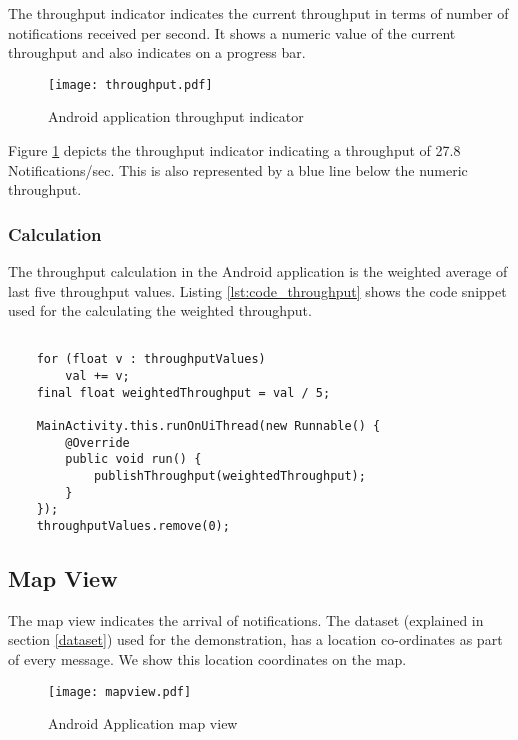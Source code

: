 The throughput indicator indicates the current throughput in terms of number of notifications received per second. It shows a numeric value of the current throughput and also indicates on a progress bar.

\begin{figure}[h!]
\centering
\texttt{[image: throughput.pdf]}
\caption{Android application throughput indicator}\label{figures:android_throughput}
\end{figure}

Figure {\ref{figures:android_throughput}} depicts the throughput indicator indicating a throughput of 27.8 Notifications/sec. This is also represented by a blue line below the numeric throughput.

\subsubsection{Calculation}

The throughput calculation in the Android application is the weighted average of last five throughput values.
Listing \ref{lst:code_throughput} shows the code snippet used for the calculating the weighted throughput.

\bigskip
\begin{lstlisting}[style=JavaInputStyle,caption=Throughput calculation code snippet, label={lst:code_throughput}]

    for (float v : throughputValues)
        val += v;
    final float weightedThroughput = val / 5;

    MainActivity.this.runOnUiThread(new Runnable() {
        @Override
        public void run() {
            publishThroughput(weightedThroughput);
        }
    });
    throughputValues.remove(0);

\end{lstlisting}

\subsection{Map View}

The map view \parencite{svennerberg2010beginning} indicates the arrival of notifications. The dataset (explained in section \ref{dataset}) used for the demonstration, has a location co-ordinates as part of every message. We show this location coordinates on the map.  

\begin{figure}[h!]
\centering
\texttt{[image: mapview.pdf]}
\caption{Android Application map view}\label{figures:android_map}
\end{figure}

